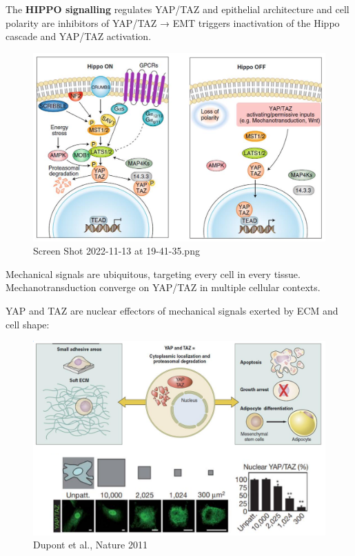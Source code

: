 The \textbf{HIPPO signalling} regulates YAP/TAZ and epithelial architecture and cell polarity are inhibitors of YAP/TAZ → EMT triggers inactivation of the Hippo cascade and YAP/TAZ activation.

\begin{figure}
\centering
\includegraphics{../_resources/Screen_Shot_2022-11-13_at_19-41-35.png}
\caption{Screen Shot 2022-11-13 at 19-41-35.png}
\end{figure}

Mechanical signals are ubiquitous, targeting every cell in every tissue. Mechanotransduction converge on YAP/TAZ in multiple cellular contexts.

YAP and TAZ are nuclear effectors of mechanical signals exerted by ECM and cell shape:

\begin{figure}
\centering
\includegraphics{../_resources/Screen_Shot_2022-11-13_at_19-43-07.png}
\caption{Dupont et al., Nature 2011}
\end{figure}

